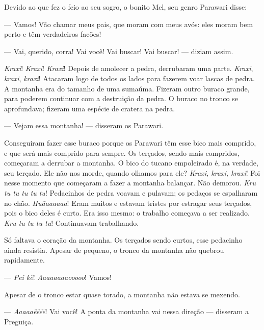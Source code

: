 Devido ao que fez o feio ao seu sogro, o bonito Mel, seu genro Parawari
disse:

--- Vamos! Vão chamar meus pais, que moram com meus avós: eles moram bem
perto e têm verdadeiros facões! 

--- Vai, querido, corra! Vai você! Vai buscar! Vai buscar! --- diziam
assim. 


\textit{Kraxi}! \textit{Kraxi}! \textit{Kraxi}! Depois de amolecer a pedra, derrubaram uma
parte. \textit{Kraxi}, \textit{kraxi}, \textit{kraxi}! Atacaram logo de todos os lados para
fazerem voar lascas de pedra. A montanha era do tamanho de uma sumaúma.
Fizeram outro buraco grande, para poderem continuar com a destruição da
pedra. O buraco no tronco se aprofundava; fizeram uma espécie de cratera
na pedra. 

--- Vejam essa montanha! --- disseram os Parawari. 

Conseguiram fazer esse buraco porque os Parawari têm esse bico mais
comprido, e que será mais comprido para sempre. Os terçados, sendo
mais compridos, começaram a derrubar a montanha. O bico do tucano
empoleirado é, na verdade, seu terçado. Ele não nos morde, quando olhamos
para ele? \textit{Kraxi, kraxi, kraxi}! Foi nesse momento que começaram a
fazer a montanha balançar. Não demorou. \textit{Kru tu tu tu tu tu}!
Pedacinhos de pedra voavam e pulavam; os pedaços se espalharam no
chão. \textit{Huãaaaaaa}! Eram muitos e estavam tristes por estragar seus
terçados, pois o bico deles é curto. Era isso mesmo: o trabalho começava
a ser realizado. \textit{Kru tu tu tu tu}! Continuavam trabalhando.

Só faltava o coração da montanha. Os terçados sendo curtos, esse
pedacinho ainda resistia. Apesar de pequeno, o tronco da montanha não
quebrou rapidamente.

--- \textit{Pei kë}! \textit{Aaaaaaaaooooo}! Vamos! 

Apesar de o tronco estar quase torado, a montanha não estava se
mexendo. 

--- \textit{Aaaaaëëëë}! Vai você! A ponta da montanha vai nessa direção
--- disseram a Preguiça. 

